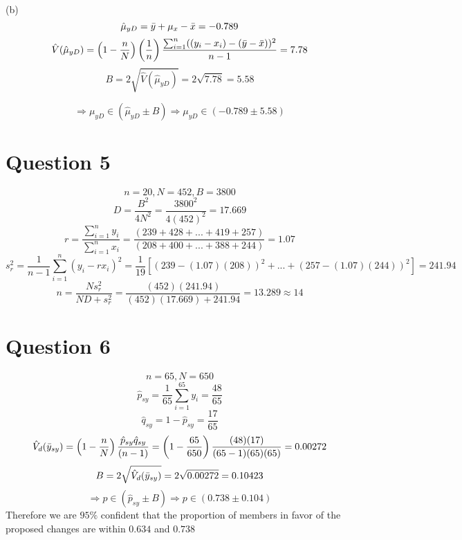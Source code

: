 \documentclass[11pt]{article}
\theoremstyle{claim}
\begin{document}
(b)
\[\hat{\mu}_{yD}=\Bar{y}+\mu_x-\Bar{x}=-0.789\]
\[\hat{V}(\hat{\mu}_{yD})=\left(1-\frac{n}{N}\right)\left(\frac{1}{n}\right)\frac{\sum^n_{i=1}((y_i-x_i)-(\Bar{y}-\Bar{x}))^2}{n-1}=7.78\]
\[B=2\sqrt{\hat{V}(\hat{\mu}_{yD})}=2\sqrt{7.78}=5.58\]

\[\Rightarrow \mu_{yD}\in(\hat{\mu}_{yD}\pm B) \Rightarrow \mu_{yD}\in(-0.789\pm 5.58)\]



\newpage
\section*{Question 5}
\[n=20, N=452, B=3800\]
\[D=\frac{B^2}{4N^2}=\frac{3800^2}{4(452)^2}=17.669\]
\[r=\frac{\sum^n_{i=1}y_i}{\sum^n_{i=1}x_i}=\frac{(239+428+...+419+257)}{(208+400+...+388+244)}=1.07\]
\[s^2_r=\frac{1}{n-1}\sum^n_{i=1}\left(y_i-rx_i\right)^2=\frac{1}{19}\left[(239-(1.07)(208))^2+...+(257-(1.07)(244))^2\right]=241.94\]
\[n=\frac{Ns^2_r}{ND+s^2_r}=\frac{(452)(241.94)}{(452)(17.669)+241.94}=13.289\approx 14\]

\section*{Question 6}
\[n=65,N=650\]
\[\hat{p}_{sy}=\frac{1}{65}\sum^{65}_{i=1}y_i=\frac{48}{65}\]
\[\hat{q}_{sy}=1-\hat{p}_{sy}=\frac{17}{65}\]
\[\hat{V}_d(\Bar{y}_{sy})=\left(1-\frac{n}{N}\right)\frac{\hat{p}_{sy}\hat{q}_{sy}}{(n-1)}=
\left(1-\frac{65}{650}\right)\frac{(48)(17)}{(65-1)(65)(65)}=0.00272\]
\[B=2\sqrt{\hat{V}_d(\Bar{y}_{sy})}=2\sqrt{0.00272}=0.10423\]
\[\Rightarrow p\in(\hat{p}_{sy}\pm B) \Rightarrow p\in\left(0.738\pm0.104\right)\]
Therefore we are $95\%$ confident that the proportion of members in favor of the proposed changes are within $0.634$ and $0.738$
\end{document}
